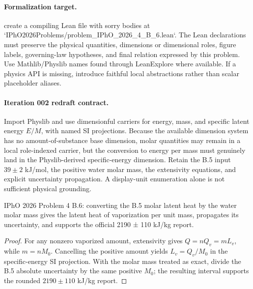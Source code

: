 \paragraph{Formalization target.}
create a compiling Lean file with sorry bodies at `IPhO2026Problems/problem\_IPhO\_2026\_4\_B\_6.lean`. The Lean declarations must preserve the physical quantities, dimensions or dimensional roles, figure labels, governing-law hypotheses, and final relation expressed by this problem.
Use Mathlib/Physlib names found through LeanExplore where available. If a physics API is missing, introduce faithful local abstractions rather than scalar placeholder aliases.

\paragraph{Iteration 002 redraft contract.}
Import Physlib and use dimensionful carriers for energy, mass, and specific
latent energy \(E/M\), with named SI projections.  Because the available
dimension system has no amount-of-substance base dimension, molar quantities
may remain in a local role-indexed carrier, but the conversion to energy per
mass must genuinely land in the Physlib-derived specific-energy dimension.
Retain the B.5 input \(39\pm2\) kJ/mol, the positive water molar mass, the
extensivity equations, and explicit uncertainty propagation.  A display-unit
enumeration alone is not sufficient physical grounding.

\begin{theorem}
  \label{thm:physics:IPhO_2026_4_B_6:target}
  IPhO 2026 Problem 4 B.6: converting the B.5 molar latent heat by the water molar mass gives the latent heat of vaporization per unit mass, propagates its uncertainty, and supports the official 2190 ± 110 kJ/kg report.
\end{theorem}
\begin{proof}
  For any nonzero vaporized amount, extensivity gives
  \(Q=nQ_v=mL_v\), while \(m=nM_0\).  Cancelling the positive amount yields
  \(L_v=Q_v/M_0\) in the specific-energy SI projection.  With the molar mass
  treated as exact, divide the B.5 absolute uncertainty by the same positive
  \(M_0\); the resulting interval supports the rounded
  \(2190\pm110\) kJ/kg report.
\end{proof}
